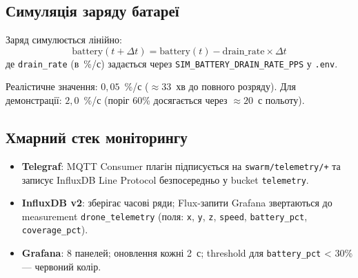 \subsection{Симуляція заряду батареї}

Заряд симулюється лінійно:
\[
\text{battery}(t+\Delta t) = \text{battery}(t) - \text{drain\_rate} \times \Delta t
\]
де \texttt{drain\_rate} (в~\%/с) задається через \texttt{SIM\_BATTERY\_DRAIN\_RATE\_PPS} у \texttt{.env}.

Реалістичне значення: $0{,}05$~\%/с ($\approx 33$~хв до повного розряду).
Для демонстрації: $2{,}0$~\%/с (поріг 60\% досягається через $\approx 20$~с польоту).

\subsection{Хмарний стек моніторингу}

\begin{itemize}
  \item \textbf{Telegraf}: MQTT Consumer плагін підписується на \texttt{swarm/telemetry/+} та записує InfluxDB Line Protocol безпосередньо у bucket \texttt{telemetry}.
  \item \textbf{InfluxDB v2}: зберігає часові ряди; Flux-запити Grafana звертаються до measurement \texttt{drone\_telemetry} (поля: \texttt{x}, \texttt{y}, \texttt{z}, \texttt{speed}, \texttt{battery\_pct}, \texttt{coverage\_pct}).
  \item \textbf{Grafana}: 8 панелей; оновлення кожні 2~с; threshold для \texttt{battery\_pct} < 30\% — червоний колір.
\end{itemize}
